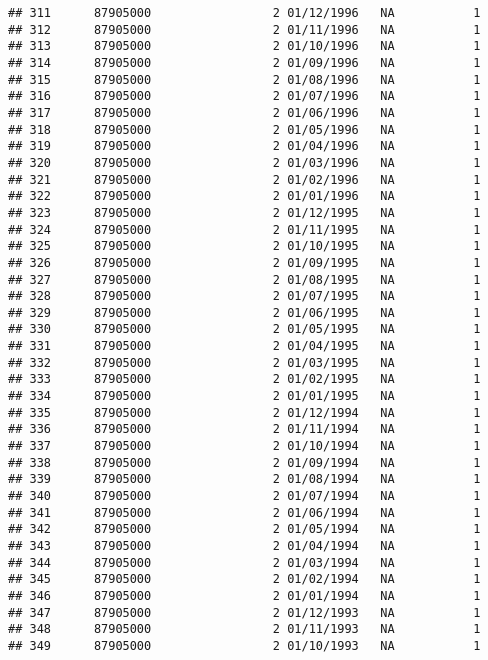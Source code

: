 \documentclass[
]{article}
\begin{document}
\begin{verbatim}
## 311      87905000                 2 01/12/1996   NA           1
## 312      87905000                 2 01/11/1996   NA           1
## 313      87905000                 2 01/10/1996   NA           1
## 314      87905000                 2 01/09/1996   NA           1
## 315      87905000                 2 01/08/1996   NA           1
## 316      87905000                 2 01/07/1996   NA           1
## 317      87905000                 2 01/06/1996   NA           1
## 318      87905000                 2 01/05/1996   NA           1
## 319      87905000                 2 01/04/1996   NA           1
## 320      87905000                 2 01/03/1996   NA           1
## 321      87905000                 2 01/02/1996   NA           1
## 322      87905000                 2 01/01/1996   NA           1
## 323      87905000                 2 01/12/1995   NA           1
## 324      87905000                 2 01/11/1995   NA           1
## 325      87905000                 2 01/10/1995   NA           1
## 326      87905000                 2 01/09/1995   NA           1
## 327      87905000                 2 01/08/1995   NA           1
## 328      87905000                 2 01/07/1995   NA           1
## 329      87905000                 2 01/06/1995   NA           1
## 330      87905000                 2 01/05/1995   NA           1
## 331      87905000                 2 01/04/1995   NA           1
## 332      87905000                 2 01/03/1995   NA           1
## 333      87905000                 2 01/02/1995   NA           1
## 334      87905000                 2 01/01/1995   NA           1
## 335      87905000                 2 01/12/1994   NA           1
## 336      87905000                 2 01/11/1994   NA           1
## 337      87905000                 2 01/10/1994   NA           1
## 338      87905000                 2 01/09/1994   NA           1
## 339      87905000                 2 01/08/1994   NA           1
## 340      87905000                 2 01/07/1994   NA           1
## 341      87905000                 2 01/06/1994   NA           1
## 342      87905000                 2 01/05/1994   NA           1
## 343      87905000                 2 01/04/1994   NA           1
## 344      87905000                 2 01/03/1994   NA           1
## 345      87905000                 2 01/02/1994   NA           1
## 346      87905000                 2 01/01/1994   NA           1
## 347      87905000                 2 01/12/1993   NA           1
## 348      87905000                 2 01/11/1993   NA           1
## 349      87905000                 2 01/10/1993   NA           1

\end{verbatim}
\end{document}
